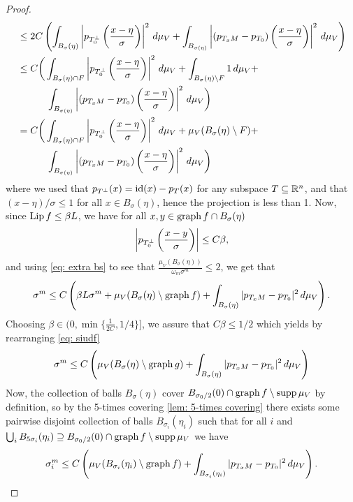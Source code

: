 \begin{proof}
\begin{align*}
    &\le 2C\left( \int_{B_{\sigma}(\eta)} \left| p_{T_0^{\perp}} \left(\frac{x-\eta}{\sigma}\right) \right|^2\,d\mu_V + \int_{B_{\sigma(\eta)}} \left| (p_{T_xM} - p_{T_0})\left(\frac{x-\eta}{\sigma}\right) \right|^2\, d\mu_V \right) \\
    &\le C\bigg( \int_{B_{\sigma}(\eta)\cap F} \left| p_{T_0^{\perp}} \left(\frac{x-\eta}{\sigma}\right) \right|^2\,d\mu_V + \int_{B_{\sigma}(\eta)\setminus F} 1\,d\mu_V + \\
    &\qquad\quad \int_{B_{\sigma(\eta)}} \left| (p_{T_xM} - p_{T_0})\left(\frac{x-\eta}{\sigma}\right) \right|^2\, d\mu_V \bigg) \\
    &= C\bigg( \int_{B_{\sigma}(\eta)\cap F} \left| p_{T_0^{\perp}} \left(\frac{x-\eta}{\sigma}\right) \right|^2\,d\mu_V + \mu_V(B_{\sigma}(\eta)\setminus F) + \\
    &\qquad\quad \int_{B_{\sigma(\eta)}} \left| (p_{T_xM} - p_{T_0})\left(\frac{x-\eta}{\sigma}\right) \right|^2\, d\mu_V \bigg)
\end{align*}
where we used that $p_{T^{\perp}}(x)=\operatorname{id}(x) - p_T(x)$ for any subspace $T \subseteq \mathbb{R}^n$, and that $(x-\eta)/\sigma \le 1$ for all $x \in B_{\sigma}(\eta)$, hence the projection is less than 1. Now, since $\operatorname{Lip} f \le \beta L$, we have for all $x,y \in \operatorname{graph} f \cap B_{\sigma}(\eta)$
\[
    \left| p_{T_0^{\perp}} \left(\frac{x-y}{\sigma}\right) \right| \le C\beta,
\]
and using \eqref{eq: extra bs} to see that $\frac{\mu_V(B_{\sigma}(\eta))}{\omega_m\sigma^m} \le 2$, we get that
\begin{equation}
    \sigma^m \le C\left(\beta L \sigma^m + \mu_V(B_{\sigma}(\eta) \setminus \operatorname{graph} f) + \int_{B_{\sigma}(\eta)} | p_{T_xM} - p_{T_0} |^2\, d\mu_V \right).\label{eq: siudf}
\end{equation}
Choosing $\beta \in (0, \min\{\frac{1}{2C},1/4\}]$, we assure that $C\beta \le 1/2$ which yields by rearranging \eqref{eq: siudf}
\[
    \sigma^m \le C\left( \mu_V( B_{\sigma}(\eta) \setminus \operatorname{graph} g ) + \int_{B_{\sigma}(\eta)} | p_{T_xM} - p_{T_0} |^2\, d\mu_V \right)
\]
Now, the collection of balls $B_{\sigma}(\eta)$ cover $B_{\sigma_0/2}(0) \cap \operatorname{graph} f \setminus \operatorname{supp} \mu_V$ by definition, so by the 5-times covering \cref{lem: 5-times covering} there exists some pairwise disjoint collection of balls $B_{\sigma_i}(\eta_i)$ such that for all $i$ and $\bigcup_i B_{5\sigma_i}(\eta_i) \supseteq B_{\sigma_0/2}(0) \cap \operatorname{graph} f \setminus \operatorname{supp} \mu_V$ we have
\begin{equation}
    \sigma_i^m \le C\paren{ \mu_V( B_{\sigma_i}(\eta_i) \setminus \Graph f ) + \int_{B_{\sigma_i}(\eta_i)} | p_{T_xM} - p_{T_0} |^2\, d\mu_V }.\label{eq: fpsdiuf}

\end{equation}
\end{proof}
